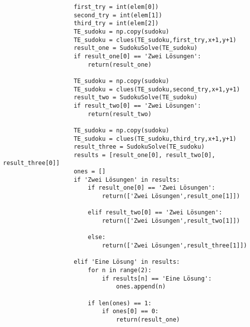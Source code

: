 \documentclass[11pt,a4paper]{article}
\begin{document}
\begin{verbatim}
                    first_try = int(elem[0])       
                    second_try = int(elem[1])     
                    third_try = int(elem[2])       
                    TE_sudoku = np.copy(sudoku)    
                    TE_sudoku = clues(TE_sudoku,first_try,x+1,y+1)  
                    result_one = SudokuSolve(TE_sudoku)   
                    if result_one[0] == 'Zwei Lösungen':  
                        return(result_one)                
                    
                    TE_sudoku = np.copy(sudoku)                    
                    TE_sudoku = clues(TE_sudoku,second_try,x+1,y+1) 
                    result_two = SudokuSolve(TE_sudoku)            
                    if result_two[0] == 'Zwei Lösungen':  
                        return(result_two)               
                                                
                    TE_sudoku = np.copy(sudoku)                   
                    TE_sudoku = clues(TE_sudoku,third_try,x+1,y+1) 
                    result_three = SudokuSolve(TE_sudoku)         
                    results = [result_one[0], result_two[0], result_three[0]] 
                    ones = []                                                 
                    if 'Zwei Lösungen' in results:                             
                        if result_one[0] == 'Zwei Lösungen':                  
                            return(['Zwei Lösungen',result_one[1]])           
                                
                        elif result_two[0] == 'Zwei Lösungen':
                            return(['Zwei Lösungen',result_two[1]])
                                
                        else:
                            return(['Zwei Lösungen',result_three[1]])
                                        
                    elif 'Eine Lösung' in results:                            
                        for n in range(2):                                    
                            if results[n] == 'Eine Lösung':                   
                                ones.append(n)                                
                        
                        if len(ones) == 1:                                    
                            if ones[0] == 0:                                  
                                return(result_one)                            
                            

\end{verbatim}
\end{document}

